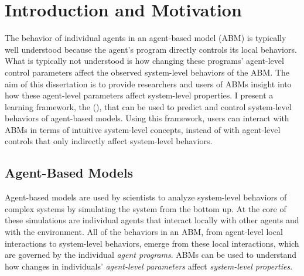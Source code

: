 \chapter{Introduction and Motivation}
\thispagestyle{plain}

\label{Introduction and Motivation}

The behavior of individual agents in an agent-based model (ABM) is typically well understood because the agent's program directly controls its local behaviors.
What is typically not understood is how changing these programs' agent-level control parameters affect the observed system-level behaviors of the ABM.
The aim of this dissertation is to provide researchers and users of ABMs insight into how these agent-level parameters affect system-level properties.
I present a learning framework, the \framework (\fw), that can be used to predict and control system-level behaviors of agent-based models.
Using this framework, users can interact with ABMs in terms of intuitive system-level concepts, instead of with agent-level controls that only indirectly affect system-level behaviors.


\section{Agent-Based Models}



Agent-based models are used by scientists to analyze system-level behaviors of complex systems by simulating the system from the bottom up.
At the core of these simulations are individual agents that interact locally with other agents and with the environment.
All of the behaviors in an ABM, from agent-level local interactions to system-level behaviors, emerge from these local interactions, which are governed by the individual \textit{agent programs}.
ABMs can be used to understand how changes in individuals' \textit{agent-level parameters} affect \textit{system-level properties}.

